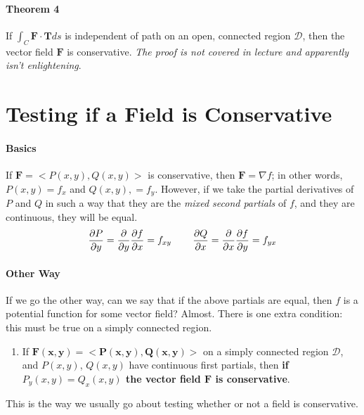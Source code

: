\documentclass{article}
\begin{document}
\paragraph{Theorem 4} If $\int_{C} \mathbf{F \cdot T}ds$ is independent of path on an open, connected region $\mathcal{D}$, then the vector field $\mathbf{F}$ is conservative. \textit{The proof is not covered in lecture and apparently isn't enlightening}.

\section*{Testing if a Field is Conservative}

\paragraph{Basics} If $\mathbf{F} = <P(x,y), Q(x,y)>$ is conservative, then $\mathbf{F} = \nabla f$; in other words, $P(x,y) = f_x$ and $Q(x,y), = f_y$. However, if we take the partial derivatives of $P$ and $Q$ in such a way that they are the \textit{mixed second partials} of $f$, and they are continuous, they will be equal.
\[ \frac{\partial P}{\partial y} = \frac{\partial }{\partial y}\frac{\partial f}{\partial x} = f_{xy} \hspace{.3in} \frac{\partial Q}{\partial x} = \frac{\partial }{\partial x} \frac{\partial f}{\partial y}=f_{yx}\]

\paragraph{Other Way} If we go the other way, can we say that if the above partials are equal, then $f$ is a potential function for some vector field? Almost. There is one extra condition: this must be true on a simply connected region.
\begin{enumerate}[label=]
    \item If $\mathbf{F(x,y) = <P(x,y), Q(x,y)>}$ on a simply connected region $\mathcal{D}$, and $P(x,y)$, $Q(x,y)$ have continuous first partials, then \textbf{if $P_y(x,y) = Q_x(x,y)$ the vector field $\mathbf{F}$ is conservative}.
\end{enumerate}
This is the way we usually go about testing whether or not a field is conservative.
\end{document}
